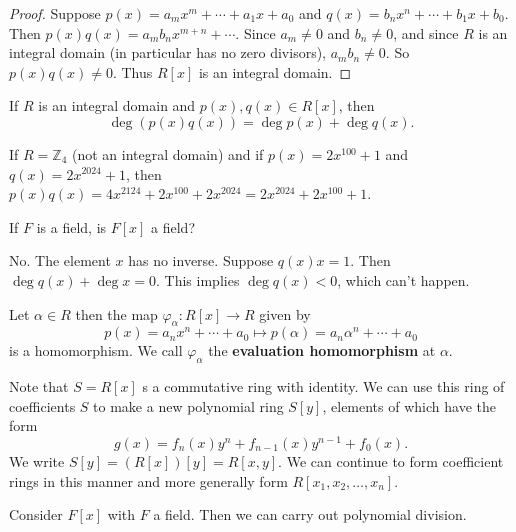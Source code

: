 \begin{proof}
	Suppose $p(x)=a_mx^m+\cdots+a_1x+a_0$ and $q(x)=b_nx^n+\cdots+b_1x+b_0$. Then $p(x)q(x)=a_mb_nx^{m+n}+\cdots$. Since $a_m\neq 0$ and $b_n\neq 0$, and since $R$ is an integral domain (in particular has no zero divisors), $a_mb_n\neq 0$. So $p(x)q(x)\neq 0$. Thus $R[x]$ is an integral domain.
\end{proof}

\begin{corollary}
	If $R$ is an integral domain and $p(x),q(x)\in R[x]$, then
	$$\deg(p(x)q(x))=\deg p(x)+\deg q(x).$$
\end{corollary}

\begin{example}
	If $R=\mathbb Z_4$ (not an integral domain) and if $p(x)=2x^{100}+1$ and $q(x)=2x^{2024}+1$, then $p(x)q(x)=4x^{2124}+2x^{100}+2x^{2024}=2x^{2024}+2x^{100}+1$.
\end{example}

\begin{example}
	If $F$ is a field, is $F[x]$ a field?
	\begin{solution}
		No. The element $x$ has no inverse. Suppose $q(x)x=1$. Then $\deg q(x)+\deg x=0$. This implies $\deg q(x)<0$, which can't happen.
	\end{solution}
\end{example}

\begin{theorem}
	Let $\alpha\in R$ then the map $\varphi_\alpha\colon R[x]\to R$ given by
	$$p(x)=a_nx^n+\cdots+a_0\mapsto p(\alpha)=a_n\alpha^n+\cdots+a_0$$
	is a homomorphism. We call $\varphi_\alpha$ the \textbf{evaluation homomorphism} at $\alpha$.
\end{theorem}

Note that $S=R[x]$ s a commutative ring with identity. We can use this ring of coefficients $S$ to make a new polynomial ring $S[y]$, elements of which have the form
$$g(x)=f_n(x)y^n+f_{n-1}(x)y^{n-1}+f_0(x).$$
We write $S[y]=(R[x])[y]=R[x,y]$. We can continue to form coefficient rings in this manner and more generally form $R[x_1,x_2,\hdots,x_n]$.

Consider $F[x]$ with $F$ a field. Then we can carry out polynomial division.

